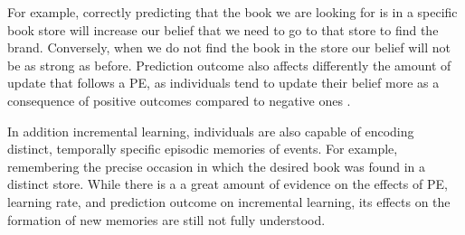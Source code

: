 \documentclass[a4paper,12pt]{article}
\begin{document}
For example, correctly predicting that the book we are looking for is in a specific book store will increase our belief that we need to go to that store to find the brand. Conversely, when we do not find the book in the store our belief will not be as strong as before. Prediction outcome also affects differently the amount of update that follows a PE, as individuals tend to update their belief more as a consequence of positive outcomes compared to negative ones \citep{Lefebvre2017, sharot2007neural, sharot2011unrealistic, sharot2016forming}.  \par
In addition incremental learning, individuals are also capable of encoding distinct, temporally specific episodic memories of events. For example, remembering the precise occasion in which the desired book was found in a distinct store. 
While there is a a great amount of evidence on the effects of PE, learning rate, and prediction outcome on incremental learning, its  effects on the formation of new memories are still not fully understood.\par
\end{document}
